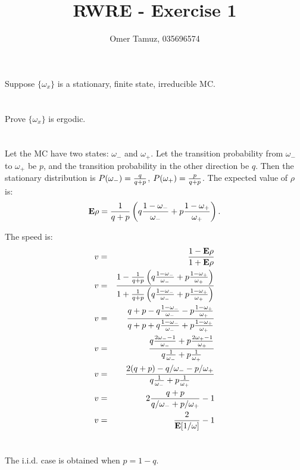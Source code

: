 \documentclass[11pt]{article} \usepackage{amssymb}
\newcommand{\E}{{\bf E}} \newcommand{\Cov}{{\bf Cov}}
\begin{document}
\title{RWRE - Exercise 1}

 \author{Omer Tamuz, 035696574}
\maketitle

Suppose $\{\omega_x\}$ is a stationary, finite state, irreducible MC.
\section{}
Prove  $\{\omega_x\}$ is ergodic.
\section{}
Let the MC have two states: $\omega_-$ and $\omega_+$. Let the transition
probability from $\omega_-$ to $\omega_+$ be $p$, and the transition
probability in the other direction be $q$. Then the stationary distribution
is $P(\omega_-)={q\over q+p}$, $P(\omega_+)={p\over q+p}$. 
The expected value of $\rho$ is:
\begin{equation*}
  \E\rho
    = {1\over q+p}\left(q{1-\omega_- \over \omega_-}+
                        p{1-\omega_+ \over \omega_+}\right).
\end{equation*}

The speed is:
\begin{eqnarray*}
  v &=& {1-\E\rho \over 1+\E\rho}\\
  v &=& {1-{1\over q+p}\left(q{1-\omega_- \over \omega_-}+
                        p{1-\omega_+ \over \omega_+}\right) 
          \over 1+{1\over q+p}\left(q{1-\omega_- \over \omega_-}+
                        p{1-\omega_+ \over \omega_+}\right)}\\
  v &=& {q+p-q{1-\omega_- \over \omega_-}- p{1-\omega_+ \over \omega_+}
          \over q+p+q{1-\omega_- \over \omega_-}+p{1-\omega_+ \over \omega_+}}\\
  v &=& {q{2\omega_--1 \over \omega_-}+ p{2\omega_+-1 \over \omega_+}
          \over q{1 \over \omega_-}+p{1 \over \omega_+}}\\
  v &=& {2(q+p)-q/\omega_--p/\omega_+
          \over q{1 \over \omega_-}+p{1 \over \omega_+}}\\
  v &=& 2{q+p \over q/\omega_-+p/\omega_+}-1\\
  v &=& {2\over\E[1/\omega]}-1\\
\end{eqnarray*}
\section{}
The i.i.d. case is obtained when $p=1-q$. 
\end{document}
